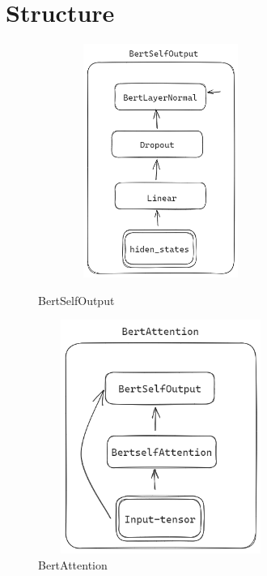 \documentclass[a4paper]{article}
\begin{document}
\begin{sloppypar}
      \newpage
      \section{Structure}


      \begin{figure}[H]
            \centering
            \begin{minipage}{0.49\linewidth}
                  \centering
                  \includegraphics[width=3.15in,height=3.0in]{BertOutput}
                  \caption{BertSelfOutput}
                  \label{BertSelfOutput}%
            \end{minipage}
            \begin{minipage}{0.49\linewidth}
                  \centering
                  \includegraphics[width=3.15in,height=3.0in]{BertAttention}
                  \caption{BertAttention}
                  \label{BertAttention}%
            \end{minipage}

      \end{figure}


\end{sloppypar}
\end{document}
